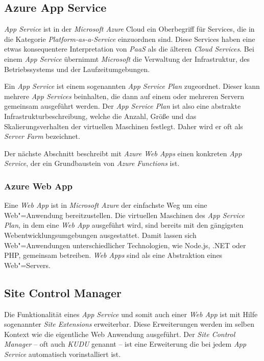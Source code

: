 \subsection{Azure App Service}

\textit{App Service} ist in der \textit{Microsoft Azure} Cloud ein Oberbegriff für Services, die in die Kategorie \textit{Platform-as-a-Service} einzuordnen sind. Diese Services haben eine etwas konsequentere Interpretation von \textit{PaaS} als die älteren \textit{Cloud Services}. Bei einem \textit{App Service} übernimmt \textit{Microsoft} die Verwaltung der Infrastruktur, des Betriebssystems und der Laufzeitumgebungen. 

Ein \textit{App Service} ist einem sogenannten \textit{App Service Plan} zugeordnet. Dieser kann mehrere \textit{App Services} beinhalten, die dann auf einem oder mehreren Servern gemeinsam ausgeführt werden. Der \textit{App Service Plan} ist also eine abstrakte Infrastrukturbeschreibung, welche die Anzahl, Größe und das Skalierungsverhalten der virtuellen Maschinen festlegt. Daher wird er oft als \textit{Server Farm} bezeichnet.

Der nächste Abschnitt beschreibt mit \textit{Azure Web Apps} einen konkreten \textit{App Service}, der ein Grundbaustein von \textit{Azure Functions} ist.

\subsubsection{Azure Web App}

Eine \textit{Web App} ist in \textit{Microsoft Azure} der einfachste Weg um eine Web"=Anwendung bereitzustellen. Die virtuellen Maschinen des \textit{App Service Plan}, in dem eine \textit{Web App} ausgeführt wird, sind bereits mit den gängigsten Webentwicklungsumgebungen ausgestattet. Damit lassen sich Web"=Anwendungen unterschiedlicher Technologien, wie \zB Node.js, .NET oder PHP, gemeinsam betreiben. \textit{Web Apps} sind als eine Abstraktion eines Web"=Servers.

\subsection{Site Control Manager}

Die Funktionalität eines \textit{App Service} und somit auch einer \textit{Web App} ist mit Hilfe sogenannter \textit{Site Extensions} erweiterbar. Diese Erweiterungen werden im selben Kontext wie die eigentliche Web Anwendung ausgeführt. Der \textit{Site Control Manager} -- oft auch \textit{KUDU} genannt -- ist eine Erweiterung die bei jedem \textit{App Service} automatisch vorinstalliert ist. 

